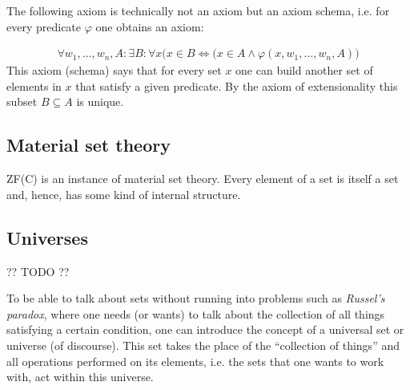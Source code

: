     The following axiom is technically not an axiom but an axiom schema, i.e. for every predicate $\varphi$ one obtains an axiom:
    \begin{axiom}[Specification]
        \begin{gather}
            \forall w_1,\ldots,w_n,A:\exists B:\forall x\big(x\in B\iff(x\in A\land\varphi(x,w_1,\ldots,w_n,A)\big)
        \end{gather}
        This axiom (schema) says that for every set $x$ one can build another set of elements in $x$ that satisfy a given predicate. By the axiom of extensionality this subset $B\subseteq A$ is unique.
    \end{axiom}

\subsection{Material set theory}

    ZF(C) is an instance of material set theory. Every element of a set is itself a set and, hence, has some kind of internal structure.


\subsection{Universes}\label{section:universes}

    ?? TODO ??

    To be able to talk about sets without running into problems such as \textit{Russel's paradox}, where one needs (or wants) to talk about the collection of all things satisfying a certain condition, one can introduce the concept of a universal set or universe (of discourse). This set takes the place of the ``collection of things'' and all operations performed on its elements, i.e. the sets that one wants to work with, act within this universe.


